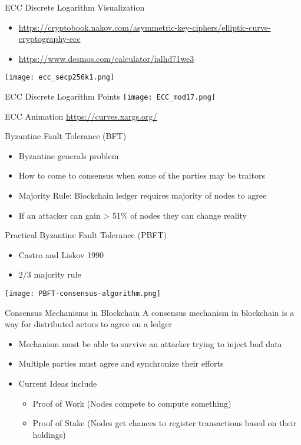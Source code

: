 \begin{frame}{ECC Discrete Logarithm Visualization}
    \begin{itemize}
        \item \url{https://cryptobook.nakov.com/asymmetric-key-ciphers/elliptic-curve-cryptography-ecc}
        \item \url{https://www.desmos.com/calculator/ialhd71we3}
    \end{itemize}
    \texttt{[image: ecc\_secp256k1.png]}
\end{frame}

\begin{frame}{ECC Discrete Logarithm Points}
    \texttt{[image: ECC\_mod17.png]}
\end{frame}

\begin{frame}{ECC Animation}
    \url{https://curves.xargs.org/}
\end{frame}
    
\begin{frame}{Byzantine Fault Tolerance (BFT)}
    \begin{itemize}
        \item Byzantine generals problem
        \item How to come to consensus when some of the parties may be traitors
        \item Majority Rule: Blockchain ledger requires majority of nodes to agree
        \item If an attacker can gain > 51\% of nodes they can change reality
    \end{itemize}
\end{frame}

\begin{frame}{Practical Byzantine Fault Tolerance (PBFT)}
    \begin{itemize}
        \item Castro and Liskov 1990 %
        \item $2/3$ majority rule
    \end{itemize}
    \texttt{[image: PBFT-consensus-algorithm.png]}
\end{frame}

\begin{frame}{Consensus Mechanisms in Blockchain}
    A consensus mechanism in blockchain is a way for distributed actors to agree on a ledger
    \begin{itemize}
        \item Mechanism must be able to survive an attacker trying to inject bad data
        \item Multiple parties must agree and synchronize their efforts
        \item Current Ideas include
        \begin{itemize}
            \item Proof of Work (Nodes compete to compute something)
            \item Proof of Stake (Nodes get chances to register transactions based on their holdings)
        \end{itemize}
    \end{itemize}
\end{frame}

